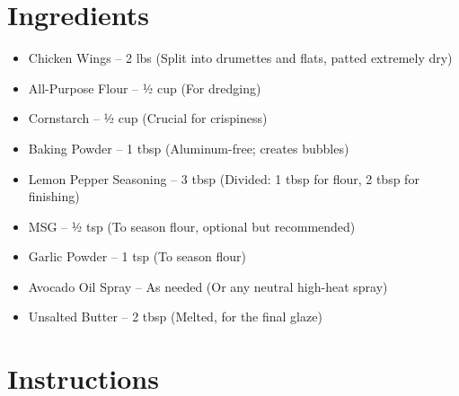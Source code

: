 




\section*{Ingredients}

\begin{itemize}
    \item[\cut] Chicken Wings – 2 lbs (Split into drumettes and flats, patted extremely dry)
    \item[\measure] All-Purpose Flour – ½ cup (For dredging)
    \item[\measure] Cornstarch – ½ cup (Crucial for crispiness)
    \item[\measure] Baking Powder – 1 tbsp (Aluminum-free; creates bubbles)
    \item[\measure] Lemon Pepper Seasoning – 3 tbsp (Divided: 1 tbsp for flour, 2 tbsp for finishing)
    \item[\measure] MSG – ½ tsp (To season flour, optional but recommended)
    \item[\measure] Garlic Powder – 1 tsp (To season flour)
    \item Avocado Oil Spray – As needed (Or any neutral high-heat spray)
    \item Unsalted Butter – 2 tbsp (Melted, for the final glaze)
\end{itemize}

\newpage


\section*{Instructions}

